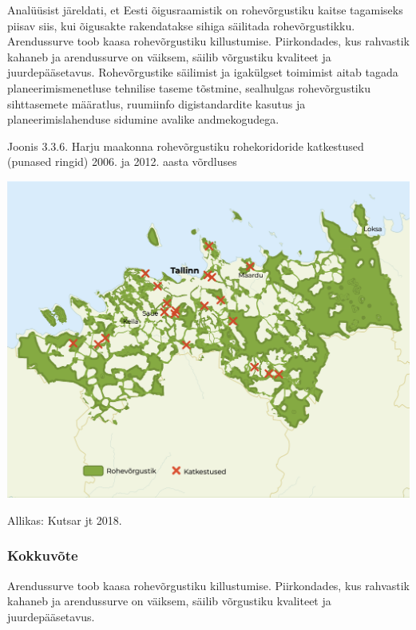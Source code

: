 \documentclass[estonian,]{article}
\begin{document}
\begin{casebox}
Analüüsist järeldati, et Eesti õigusraamistik on rohevõrgustiku kaitse
tagamiseks piisav siis, kui õigusakte rakendatakse sihiga säilitada
rohevõrgustikku. Arendussurve toob kaasa rohevõrgustiku killustumise.
Piirkondades, kus rahvastik kahaneb ja arendussurve on väiksem, säilib
võrgustiku kvaliteet ja juurdepääsetavus. Rohevõrgustike säilimist ja
igakülgset toimimist aitab tagada planeerimismenetluse tehnilise taseme
tõstmine, sealhulgas rohevõrgustiku sihttasemete määratlus, ruumiinfo
digistandardite kasutus ja planeerimislahenduse sidumine avalike
andmekogudega.
\end{casebox}

{Joonis 3.3.6.} Harju maakonna rohevõrgustiku rohekoridoride katkestused (punased ringid) 2006. ja 2012. aasta võrdluses

\begin{center}\includegraphics[width=1\linewidth]{figures/3-chapter/fig336} \end{center}

\begin{imgsource}
{Allikas:} Kutsar jt 2018.
\end{imgsource}

\hypertarget{kokkuvuxf5te-9}{%
\subsubsection*{Kokkuvõte}\label{kokkuvuxf5te-9}}

\begin{blockquote-right}
Arendussurve toob kaasa rohevõrgustiku killustumise. Piirkondades, kus
rahvastik kahaneb ja arendussurve on väiksem, säilib võrgustiku
kvaliteet ja juurdepääsetavus.
\end{blockquote-right}
\end{document}

